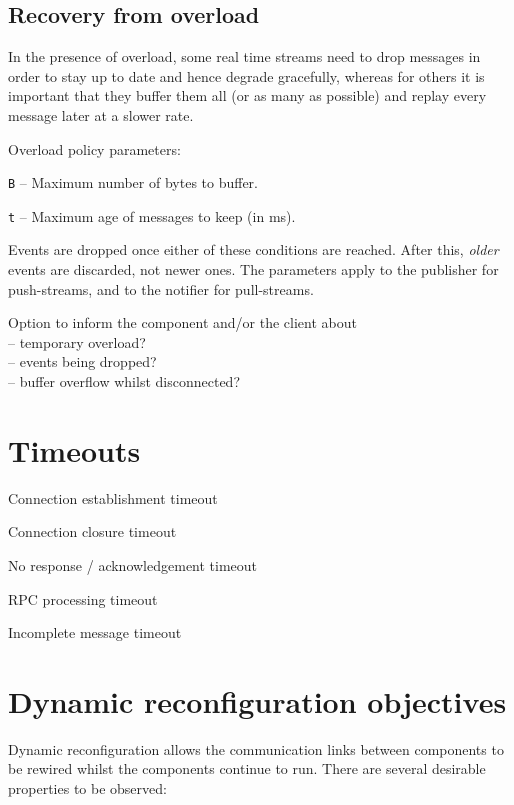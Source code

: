 \documentclass[12pt,a4paper,twoside]{article}
\renewcommand{\_}{\texttt{\symbol{95}}}
\begin{document}
\subsection{Recovery from overload}
\label{overload-policy}

In the presence of overload, some real time streams need to drop
messages in order to stay up to date and hence degrade gracefully,
whereas for others it is important that they buffer them all
(or as many as possible) and replay every message later at a slower rate.

Overload policy parameters:
\begin{bulletlist}
\item \texttt{B} -- Maximum number of bytes to buffer.
\item \texttt{t} -- Maximum age of messages to keep (in ms).
\end{bulletlist}

Events are dropped once either of these conditions are reached.
After this, \textit{older} events are discarded, not newer ones.
The parameters apply to the publisher for push-streams, and to
the notifier for pull-streams.

Option to inform the component and/or the client about\\
-- temporary overload?\\
-- events being dropped?\\
-- buffer overflow whilst disconnected?\\

\section{Timeouts}

\begin{bulletlist}
\item Connection establishment timeout
\item Connection closure timeout
\item No response / acknowledgement timeout
\item RPC processing timeout
\item Incomplete message timeout
\end{bulletlist}

\section{Dynamic reconfiguration objectives}

Dynamic reconfiguration allows the communication links between components
to be rewired whilst the components continue to run. There are several
desirable properties to be observed:
\end{document}
